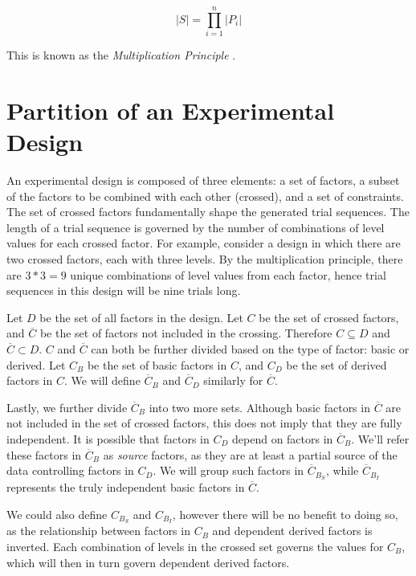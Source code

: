 \[
|S| = \prod_{i=1}^n |P_i|
\]

This is known as the \textit{Multiplication Principle} \cite{brualdi_introductory_2010}.


\section{Partition of an Experimental Design}

An experimental design is composed of three elements: a set of factors, a subset of the factors to be combined with each other (crossed), and a set of constraints. The set of crossed factors fundamentally shape the generated trial sequences. The length of a trial sequence is governed by the number of combinations of level values for each crossed factor. For example, consider a design in which there are two crossed factors, each with three levels. By the multiplication principle, there are $3 * 3 = 9$ unique combinations of level values from each factor, hence trial sequences in this design will be nine trials long.

Let $D$ be the set of all factors in the design. Let $C$ be the set of crossed factors, and $\overline{C}$ be the set of factors not included in the crossing. Therefore $C \subseteq D$ and $\overline{C} \subset D$. $C$ and $\overline{C}$ can both be further divided based on the type of factor: basic or derived. Let $C_B$ be the set of basic factors in $C$, and $C_D$ be the set of derived factors in $C$. We will define $\overline{C}_B$ and $\overline{C}_D$ similarly for $\overline{C}$.

Lastly, we further divide $\overline{C}_B$ into two more sets. Although basic factors in $\overline{C}$ are not included in the set of crossed factors, this does not imply that they are fully independent. It is possible that factors in $C_D$ depend on factors in $\overline{C}_B$. We'll refer these factors in $\overline{C}_B$ as \textit{source} factors, as they are at least a partial source of the data controlling factors in $C_D$. We will group such factors in $\overline{C}_{B_S}$, while $\overline{C}_{B_I}$ represents the truly independent basic factors in $\overline{C}$.

We could also define $C_{B_S}$ and $C_{B_I}$, however there will be no benefit to doing so, as the relationship between factors in $C_B$ and dependent derived factors is inverted. Each combination of levels in the crossed set governs the values for $C_B$, which will then in turn govern dependent derived factors.

